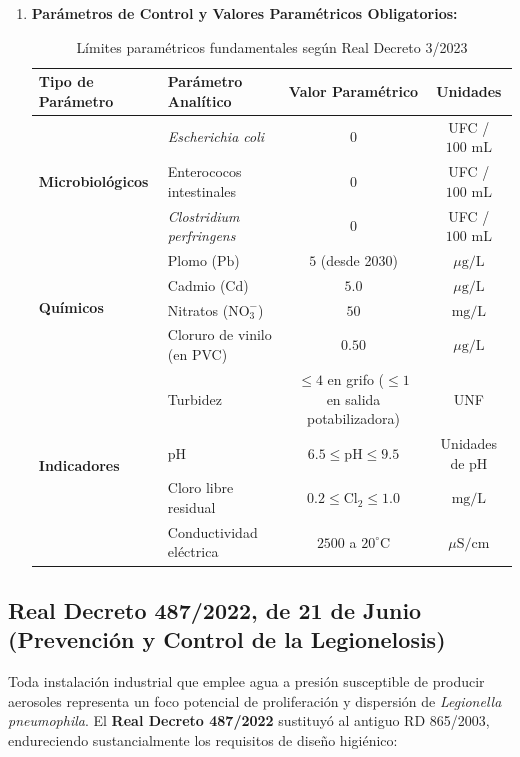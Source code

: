 \documentclass{report}
\begin{document}
\begin{enumerate}
\begin{itemize}
          \end{itemize}
    \item \textbf{Parámetros de Control y Valores Paramétricos Obligatorios:}
          \begin{table}[H]
              \centering
              \small
              \caption{Límites paramétricos fundamentales según Real Decreto 3/2023}
              \label{tab:parametros_rd3_2023}
              \begin{tabularx}{\textwidth}{@{}lXcc@{}}
                  \toprule
                  \textbf{Tipo de Parámetro} & \textbf{Parámetro Analítico} & \textbf{Valor Paramétrico} & \textbf{Unidades} \\
                  \midrule
                  \multirow{3}{*}{\textbf{Microbiológicos}} 
                  & \textit{Escherichia coli} & $0$ & UFC / $100\text{ mL}$ \\
                  & Enterococos intestinales & $0$ & UFC / $100\text{ mL}$ \\
                  & \textit{Clostridium perfringens} & $0$ & UFC / $100\text{ mL}$ \\
                  \midrule
                  \multirow{4}{*}{\textbf{Químicos}} 
                  & Plomo ($\text{Pb}$) & $5$ (desde 2030) & $\mu\text{g/L}$ \\
                  & Cadmio ($\text{Cd}$) & $5.0$ & $\mu\text{g/L}$ \\
                  & Nitratos ($\text{NO}_3^-$) & $50$ & $\text{mg/L}$ \\
                  & Cloruro de vinilo (en PVC) & $0.50$ & $\mu\text{g/L}$ \\
                  \midrule
                  \multirow{4}{*}{\textbf{Indicadores}} 
                  & Turbidez & $\le 4$ en grifo ($\le 1$ en salida potabilizadora) & UNF \\
                  & pH & $6.5 \le \text{pH} \le 9.5$ & Unidades de pH \\
                  & Cloro libre residual & $0.2 \le \text{Cl}_2 \le 1.0$ & $\text{mg/L}$ \\
                  & Conductividad eléctrica & $2500$ a $20^\circ\text{C}$ & $\mu\text{S/cm}$ \\
                  \bottomrule
              \end{tabularx}
          \end{table}
\end{enumerate}

\subsection{Real Decreto 487/2022, de 21 de Junio (Prevención y Control de la Legionelosis)}
Toda instalación industrial que emplee agua a presión susceptible de producir aerosoles representa un foco potencial de proliferación y dispersión de \textit{Legionella pneumophila}. El \textbf{Real Decreto 487/2022} \cite{RD487_2022} sustituyó al antiguo RD 865/2003, endureciendo sustancialmente los requisitos de diseño higiénico:
\end{document}
